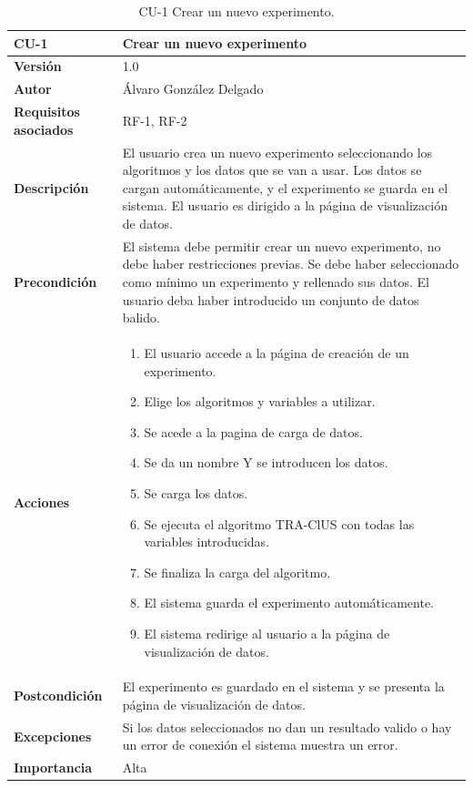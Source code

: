 \begin{table}[p]
	\centering
	\begin{tabularx}{\linewidth}{ p{} p{} }
		\toprule
		\textbf{CU-1}    & \textbf{Crear un nuevo experimento} \\
		\toprule
		\textbf{Versión}              & 1.0    \\
		\textbf{Autor}                & Álvaro González Delgado \\ 
		\textbf{Requisitos asociados} & RF-1, RF-2 \\
		\textbf{Descripción}          & El usuario crea un nuevo experimento seleccionando los algoritmos y los datos que se van a usar. Los datos se cargan automáticamente, y el experimento se guarda en el sistema. El usuario es dirigido a la página de visualización de datos. \\
		\textbf{Precondición}         & El sistema debe permitir crear un nuevo experimento, no debe haber restricciones previas. Se debe haber seleccionado como mínimo un experimento y rellenado sus datos. El usuario deba haber introducido un conjunto de datos balido. \\
		
		\textbf{Acciones}             &
		\begin{enumerate}
			\item El usuario accede a la página de creación de un experimento.
			\item Elige los algoritmos y variables a utilizar.
			\item Se acede a la pagina de carga de datos.
			\item Se da un nombre Y se introducen los datos.
			\item Se carga los datos.
			\item Se ejecuta el algoritmo TRA-ClUS con todas las variables introducidas.
			\item Se finaliza la carga del algoritmo.
			\item El sistema guarda el experimento automáticamente.
			\item El sistema redirige al usuario a la página de visualización de datos.
		\end{enumerate} \\
		\textbf{Postcondición}        & El experimento es guardado en el sistema y se presenta la página de visualización de datos. \\
		\textbf{Excepciones}          & Si los datos seleccionados no dan un resultado valido o hay un error de conexión el sistema muestra un error. \\
		\textbf{Importancia}          & Alta \\
		\bottomrule
	\end{tabularx}
	\caption{CU-1 Crear un nuevo experimento.}
\end{table}

